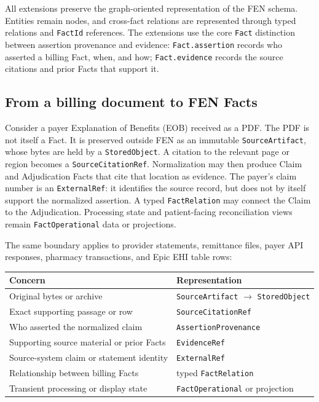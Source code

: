 \documentclass[11pt]{article}
\begin{document}
All extensions preserve the graph-oriented representation of the FEN
schema. Entities remain nodes, and cross-fact relations are represented
through typed relations and \texttt{FactId} references. The extensions use
the core \texttt{Fact} distinction between assertion provenance and evidence:
\texttt{Fact.assertion} records who asserted a billing Fact, when, and how;
\texttt{Fact.evidence} records the source citations and prior Facts that
support it.

\subsection{From a billing document to FEN Facts}

Consider a payer Explanation of Benefits (EOB) received as a PDF. The PDF is
not itself a Fact. It is preserved outside FEN as an immutable
\texttt{SourceArtifact}, whose bytes are held by a \texttt{StoredObject}.
A citation to the relevant page or region becomes a
\texttt{SourceCitationRef}. Normalization may then produce Claim and
Adjudication Facts that cite that location as evidence. The payer's claim
number is an \texttt{ExternalRef}: it identifies the source record, but does
not by itself support the normalized assertion. A typed \texttt{FactRelation}
may connect the Claim to the Adjudication. Processing state and patient-facing
reconciliation views remain \texttt{FactOperational} data or projections.

The same boundary applies to provider statements, remittance files, payer API
responses, pharmacy transactions, and Epic EHI table rows:

\begin{center}
\small
\renewcommand{\arraystretch}{1.15}
\begin{tabular}{>{\raggedright\arraybackslash}p{5.4cm} >{\raggedright\arraybackslash}p{7.6cm}}
\textbf{Concern} & \textbf{Representation} \\
\hline
Original bytes or archive & \texttt{SourceArtifact} $\rightarrow$ \texttt{StoredObject} \\
Exact supporting passage or row & \texttt{SourceCitationRef} \\
Who asserted the normalized claim & \texttt{AssertionProvenance} \\
Supporting source material or prior Facts & \texttt{EvidenceRef} \\
Source-system claim or statement identity & \texttt{ExternalRef} \\
Relationship between billing Facts & typed \texttt{FactRelation} \\
Transient processing or display state & \texttt{FactOperational} or projection \\
\end{tabular}
\end{center}
\end{document}
